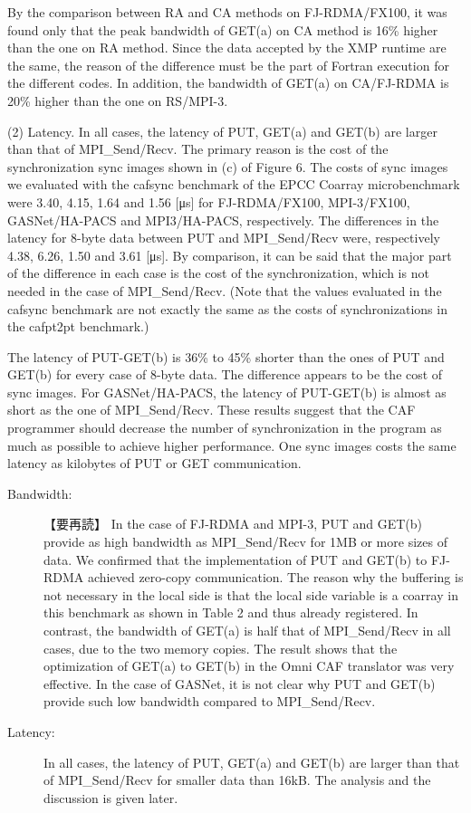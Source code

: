 By the comparison between RA and CA methods on FJ-RDMA/FX100, it was found only that the peak bandwidth of GET(a) on CA method is 16\% higher than the one on RA method. Since the data accepted by the XMP runtime are the same, the reason of the difference must be the part of Fortran execution for the different codes. In addition, the bandwidth of GET(a) on CA/FJ-RDMA is 20\% higher than the one on RS/MPI-3.

(2) Latency. In all cases, the latency of PUT, GET(a) and GET(b) are larger than that of MPI\_Send/Recv. The primary reason is the cost of the synchronization sync images shown in (c) of Figure 6. The costs of sync images we evaluated with the cafsync benchmark of the EPCC Coarray microbenchmark were
3.40, 4.15, 1.64 and 1.56 [μs]
for FJ-RDMA/FX100, MPI-3/FX100, GASNet/HA-PACS and MPI3/HA-PACS, respectively. The differences in the latency for 8-byte data between PUT and MPI\_Send/Recv were, respectively
4.38, 6.26, 1.50 and 3.61 [μs].
By comparison, it can be said that the major part of the difference in each case is the cost of the synchronization, which is not needed in the case of MPI\_Send/Recv. (Note that the values evaluated in the cafsync benchmark are not exactly the same as the costs of synchronizations in the cafpt2pt benchmark.) 

The latency of PUT-GET(b) is 36\% to 45\% shorter than the ones of PUT and GET(b) for every case of 8-byte data. The difference appears to be the cost of sync images. For GASNet/HA-PACS, the latency of PUT-GET(b) is almost as short as the one of MPI\_Send/Recv.
These results suggest that the CAF programmer should decrease the number of synchronization in the program as much as possible to achieve higher performance. One sync images costs the same latency as kilobytes of PUT or GET communication.



\begin{description}
\item[Bandwidth:~] 【要再読】
In the case of FJ-RDMA and MPI-3, PUT and GET(b) provide as high 
bandwidth as MPI\_Send/Recv for 1MB or more sizes of data. We confirmed that 
the implementation of PUT and GET(b) to FJ-RDMA achieved zero-copy communication. 
The reason why the buffering is not necessary in the local side is that the local 
side variable is a coarray in this benchmark as shown in Table 2 and thus already 
registered. 
In contrast, the bandwidth of GET(a) is half that of MPI\_Send/Recv in all cases, 
due to the two memory copies. The result shows that the optimization of GET(a) 
to GET(b) in the Omni CAF translator was very effective. In the case of GASNet, 
it is not clear why PUT and GET(b) provide such low bandwidth compared to MPI\_Send/Recv.

\item[Latency:~]
In all cases, the latency of PUT, GET(a) and GET(b) are larger than that of 
MPI\_Send/Recv for smaller data than 16kB. The analysis and the discussion 
is given later.

\end{description}






